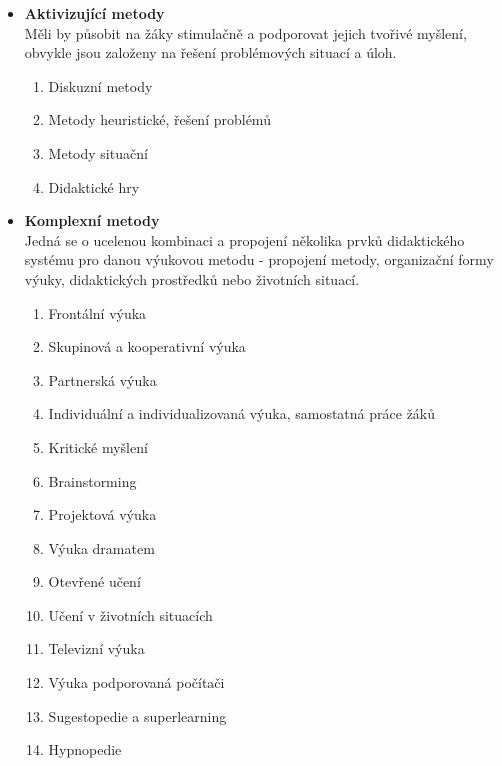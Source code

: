 \begin{itemize}
        \item \textbf{Aktivizující metody} \\
            Měli by působit na žáky stimulačně a podporovat jejich tvořivé myšlení, obvykle jsou založeny na řešení problémových situací a úloh.
            
            \begin{enumerate}
                \item Diskuzní metody
                \item Metody heuristické, řešení problémů
                \item Metody situační
                \item Didaktické hry
            \end{enumerate}{}
            
        \item \textbf{Komplexní metody} \\
            Jedná se o ucelenou kombinaci a propojení několika prvků didaktického systému pro danou výukovou metodu - propojení metody, organizační formy výuky, didaktických prostředků nebo životních situací.
        
            \begin{enumerate}
                \item Frontální výuka
                \item Skupinová a kooperativní výuka
                \item Partnerská výuka
                \item Individuální a individualizovaná výuka, samostatná práce žáků
                \item Kritické myšlení
                \item Brainstorming
                \item Projektová výuka
                \item Výuka dramatem
                \item Otevřené učení
                \item Učení v životních situacích
                \item Televizní výuka
                \item Výuka podporovaná počítači
                \item Sugestopedie a superlearning
                \item Hypnopedie
            \end{enumerate}{}
    \end{itemize}{}
 
 




